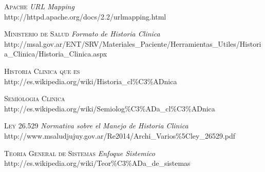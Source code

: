 \begin{thebibliography}{X}
     \textsc{Apache} \textit{URL Mapping}  \\
        http://httpd.apache.org/docs/2.2/urlmapping.html

     \textsc{Ministerio de Salud } \textit{Formato de Historia Clinica} \\
        http://msal.gov.ar/ENT/SRV/Materiales\_Paciente/Herramientas\_Utiles/Historia\_Clinica/Historia\_Clinica.aspx
   
     \textsc{Historia Clinica que es}  \\
        http://es.wikipedia.org/wiki/Historia\_cl\%C3\%ADnica

     \textsc{Sem\'{\i}ologia Clinica}  \\
        http://es.wikipedia.org/wiki/Semiolog\%C3\%ADa\_cl\%C3\%ADnica

     \textsc{Ley 26.529} \textit{Normativa sobre el Manejo de Historia Clinica} \\
        http://www.msaludjujuy.gov.ar/Re2014/Archi\_Varios\%5Cley\_26529.pdf

     \textsc{Teoria General de Sistemas} \textit{Enfoque Sistemico}
        http://es.wikipedia.org/wiki/Teor\%C3\%ADa\_de\_sistemas
    
\end{thebibliography}
